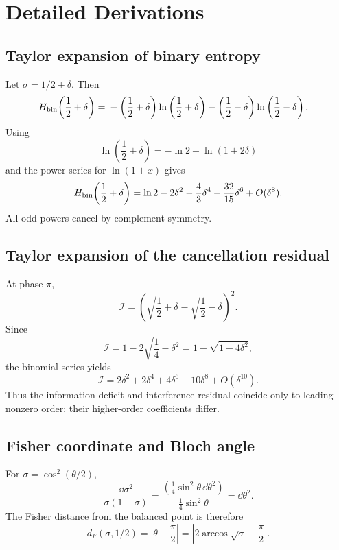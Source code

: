 \chapter{Detailed Derivations}
\label{app:derivations}

\section{Taylor expansion of binary entropy}
Let $\sigma=1/2+\delta$. Then
\begin{align}
H_{\mathrm{bin}}\!\left(\frac12+\delta\right)
={}&-\left(\frac12+\delta\right)
\ln\left(\frac12+\delta\right)
-\left(\frac12-\delta\right)
\ln\left(\frac12-\delta\right).
\end{align}
Using
\begin{equation}
\ln\left(\frac12\pm\delta\right)
=-\ln2+\ln(1\pm2\delta)
\end{equation}
and the power series for $\ln(1+x)$ gives
\begin{equation}
H_{\mathrm{bin}}\!\left(\frac12+\delta\right)
=\ln2-2\delta^2-\frac43\delta^4-\frac{32}{15}\delta^6+O(\delta^8).
\end{equation}
All odd powers cancel by complement symmetry.

\section{Taylor expansion of the cancellation residual}
At phase $\pi$,
\begin{equation}
\mathcal I
=\left(\sqrt{\frac12+\delta}-\sqrt{\frac12-\delta}\right)^2.
\end{equation}
Since
\begin{equation}
\mathcal I=1-2\sqrt{\frac14-\delta^2}
=1-\sqrt{1-4\delta^2},
\end{equation}
the binomial series yields
\begin{equation}
\mathcal I
=2\delta^2+2\delta^4+4\delta^6+10\delta^8+O(\delta^{10}).
\end{equation}
Thus the information deficit and interference residual coincide only to leading nonzero order; their higher-order coefficients differ.

\section{Fisher coordinate and Bloch angle}
For $\sigma=\cos^2(\theta/2)$,
\begin{equation}
\frac{\dd\sigma^2}{\sigma(1-\sigma)}
=\frac{(\frac14\sin^2\theta\,\dd\theta^2)}{\frac14\sin^2\theta}
=\dd\theta^2.
\end{equation}
The Fisher distance from the balanced point is therefore
\begin{equation}
d_F(\sigma,1/2)
=\left|\theta-\frac\pi2\right|
=\left|2\arccos\sqrt\sigma-\frac\pi2\right|.
\end{equation}

